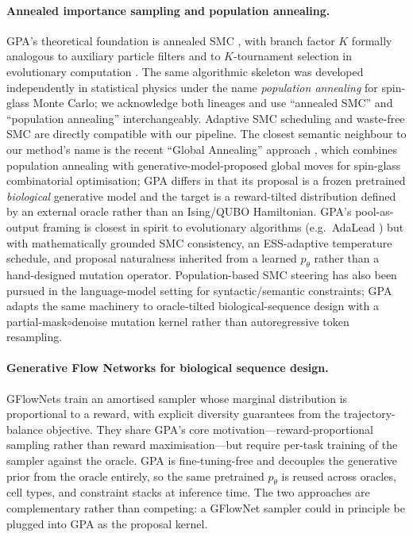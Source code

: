 \documentclass{article}
\theoremstyle{definition}
\theoremstyle{remark}
\newcommand{\gpa}{\textsc{GPA}\xspace}
\begin{document}
\paragraph{Annealed importance sampling and population annealing.}
\gpa{}'s theoretical foundation is annealed SMC \citep{neal2001ais,delmoral2006smc,delmoral2012adaptive,naesseth2019elements}, with branch factor $K$ formally analogous to auxiliary particle filters \citep{pittshephard1999} and to $K$-tournament selection in evolutionary computation \citep{blickle1995}. The same algorithmic skeleton was developed independently in statistical physics under the name \emph{population annealing} \citep{hukushima2003pa,machta2010pa,wang2015pa} for spin-glass Monte Carlo; we acknowledge both lineages and use ``annealed SMC'' and ``population annealing'' interchangeably. Adaptive SMC scheduling \citep{kviman2024} and waste-free SMC \citep{dau2022wastefree} are directly compatible with our pipeline. The closest semantic neighbour to our method's name is the recent ``Global Annealing'' approach \citep{globalannealing2025}, which combines population annealing with generative-model-proposed global moves for spin-glass combinatorial optimisation; \gpa{} differs in that its proposal is a frozen pretrained \emph{biological} generative model and the target is a reward-tilted distribution defined by an external oracle rather than an Ising/QUBO Hamiltonian. \gpa{}'s pool-as-output framing is closest in spirit to evolutionary algorithms (e.g.\ AdaLead \citep{adalead2020}) but with mathematically grounded SMC consistency, an ESS-adaptive temperature schedule, and proposal naturalness inherited from a learned $p_\theta$ rather than a hand-designed mutation operator. Population-based SMC steering has also been pursued in the language-model setting \citep{lew2023llamppl,loula2025syntsmc} for syntactic/semantic constraints; \gpa{} adapts the same machinery to oracle-tilted biological-sequence design with a partial-mask$\circ$denoise mutation kernel rather than autoregressive token resampling.

\paragraph{Generative Flow Networks for biological sequence design.}
GFlowNets \citep{jain2022gflownetbio} train an amortised sampler whose marginal distribution is proportional to a reward, with explicit diversity guarantees from the trajectory-balance objective. They share \gpa{}'s core motivation---reward-proportional sampling rather than reward maximisation---but require per-task training of the sampler against the oracle. \gpa{} is fine-tuning-free and decouples the generative prior from the oracle entirely, so the same pretrained $p_\theta$ is reused across oracles, cell types, and constraint stacks at inference time. The two approaches are complementary rather than competing: a GFlowNet sampler could in principle be plugged into \gpa{} as the proposal kernel.
\end{document}
